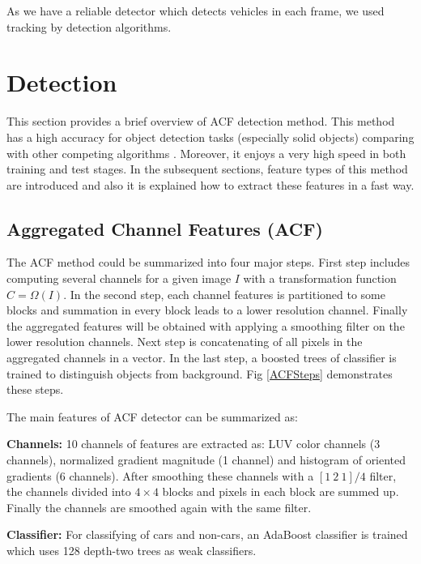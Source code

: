 \documentclass[conference]{IEEEtran}
\begin{document}
As we have a reliable  detector which detects vehicles in each frame, we used tracking by detection algorithms. 









\section{Detection}
This section provides a brief overview of ACF detection \cite{dollar2014fast} method. This method has a high accuracy for object detection tasks (especially solid objects) comparing with other competing algorithms \cite{dollar2010fastest}. Moreover, it enjoys a very high speed in both training and test stages. In the subsequent sections, feature types of this method are introduced and also it is explained how to extract these features in a fast way.

\subsection{Aggregated Channel Features (ACF)}
The ACF method could be summarized into four major steps.
First step includes computing several channels for a given image $I$ with a transformation function $C=\Omega({I})$. In the second step, each channel features is partitioned to some blocks and summation in every block leads to a lower resolution channel. Finally the aggregated features will be obtained with applying a smoothing filter on the lower resolution channels. Next step is concatenating of all pixels in the aggregated channels in a vector. In the last step, a boosted trees of classifier is trained to distinguish objects from background. Fig \ref{ACFSteps} demonstrates these steps. 

The main features of ACF detector can be summarized as:

\textbf{Channels:} 
 10 channels of features are extracted as: LUV color channels (3 channels), normalized gradient magnitude (1 channel) and histogram of oriented gradients (6 channels). After smoothing these channels with a 
$[1\ 2\ 1]/4$ filter, 
the channels divided into $4 \times 4$ blocks and pixels in each block are summed up. Finally the channels are smoothed again with the same filter.

\textbf{Classifier:} For classifying of cars and non-cars, an AdaBoost classifier \cite{friedman2000additive} is trained which uses 128 depth-two trees as weak classifiers.
\end{document}
